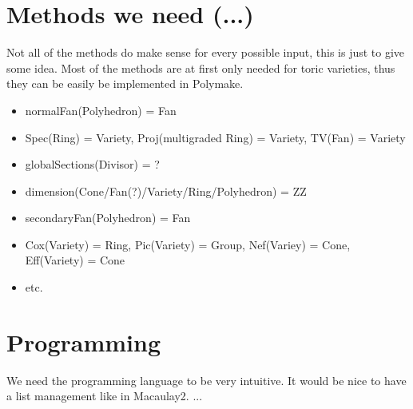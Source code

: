 \documentclass[a4paper]{article}
\begin{document}
\section{Methods we need (...)}
Not all of the methods do make sense for every possible input, this is just to give some idea. Most of the methods are at first only needed for toric varieties, thus they can be easily be implemented in Polymake.
\begin{itemize}
\item normalFan(Polyhedron) = Fan 
\item Spec(Ring) = Variety, Proj(multigraded Ring) = Variety, TV(Fan) = Variety
\item globalSections(Divisor) = ?
\item dimension(Cone/Fan(?)/Variety/Ring/Polyhedron) = ZZ
\item secondaryFan(Polyhedron) = Fan
\item Cox(Variety) = Ring, Pic(Variety) = Group, Nef(Variey) = Cone, Eff(Variety) = Cone
\item etc.
\end{itemize}

\section{Programming}
We need the programming language to be very intuitive.
It would be nice to have a list management like in Macaulay2.
...




\end{document}

